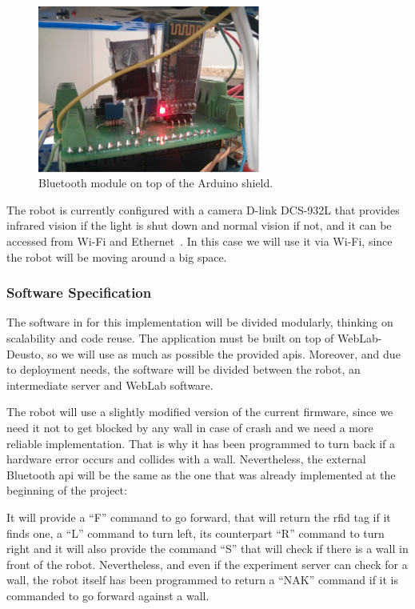 \begin{figure}[!htbp]
	\centering
	\includegraphics[width=0.65\textwidth]{fig/bluetooth}
	\caption{Bluetooth module on top of the Arduino shield.}
	\label{fig:bluetooth}
\end{figure}

The robot is currently configured with a camera D-link DCS-932L that provides infrared vision if the
light is shut down and normal vision if not, and it can be accessed from Wi-Fi and
Ethernet~\cite{camera}. In this case we will use it via Wi-Fi, since the robot will be moving around
a big space.

\subsubsection{Software Specification}

The software in for this implementation will be divided modularly, thinking on scalability and
code reuse. The application must be built on top of WebLab-Deusto, so we will use as much as
possible the provided \acrshort{api}s. Moreover, and due to deployment needs, the software will be
divided between the robot, an intermediate server and WebLab software.

The robot will use a slightly modified version of the current firmware, since we need it not to get
blocked by any wall in case of crash and we need a more reliable implementation. That is why it has
been programmed to turn back if a hardware error occurs and collides with a wall. Nevertheless, the
external Bluetooth \acrshort{api} will be the same as the one that was already implemented at the
beginning of the project:

It will provide a ``F'' command to go forward, that will return the \acrshort{rfid} tag if it finds
one, a ``L'' command to turn left, its counterpart ``R'' command to turn right and it will also
provide the command ``S'' that will check if there is a wall in front of the robot. Nevertheless,
and even if the experiment server can check for a wall, the robot itself has been programmed to
return a ``NAK'' command if it is commanded to go forward against a wall.

